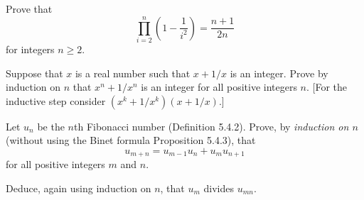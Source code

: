 \documentclass{homework}
\begin{document}
\begin{solution}

\end{solution}

\begin{problem}[Eccles I.19, p. 56]
Prove that
\begin{equation*}
\prod_{i=2}^n \left(1 - \frac{1}{i^2}\right) = \frac{n+1}{2 n}
\end{equation*}
for integers $n \geq 2$.
\end{problem}

\begin{solution}

\end{solution}

\begin{problem}[Eccles I.21, p. 56]
Suppose that $x$ is a real number such that $x + 1/x$ is an integer.
Prove by induction on $n$ that $x^n + 1/x^n$ is an integer for all positive
integers $n$.
[For the inductive step consider $(x^k + 1/x^k)(x + 1/x)$.]
\end{problem}

\begin{solution}

\end{solution}

\begin{problem}[Eccles I.25, p. 57]
Let $u_n$ be the $n$th Fibonacci number (Definition 5.4.2).
Prove, by \emph{induction on $n$} (without using the Binet formula Proposition
5.4.3), that
\begin{equation*}
u_{m + n} = u_{m-1} u_n + u_m u_{n+1}
\end{equation*}
for all positive integers $m$ and $n$.

Deduce, again using induction on $n$, that $u_m$ divides $u_{m n}$.
\end{problem}

\begin{solution}

\end{solution}
\end{document}

